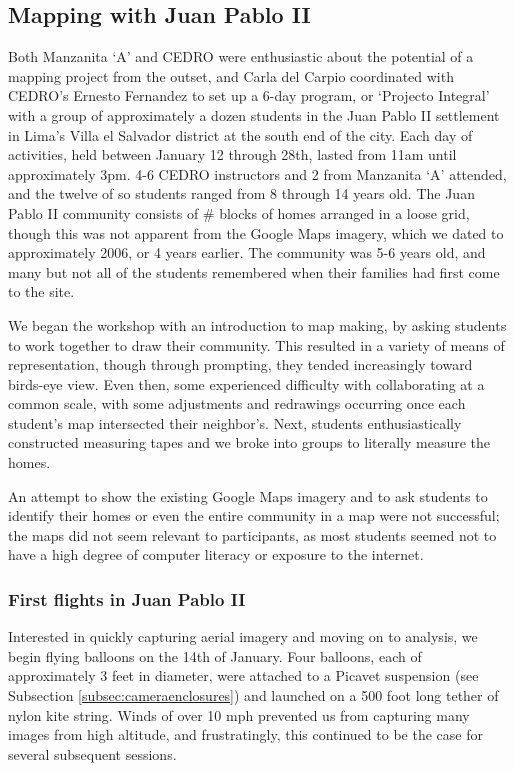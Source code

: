 \documentclass[11pt]{report}
\begin{document}
\subsection{Mapping with Juan Pablo II}

Both Manzanita `A' and CEDRO were enthusiastic about the potential of a mapping project from the outset, and Carla del Carpio coordinated with CEDRO's Ernesto Fernandez to set up a 6-day program, or `Projecto Integral' with a group of approximately a dozen students in the Juan Pablo II settlement in Lima's Villa el Salvador district at the south end of the city. Each day of activities, held between January 12 through 28th, lasted from 11am until approximately 3pm. 4-6 CEDRO instructors and 2 from Manzanita `A' attended, and the twelve of so students ranged from 8 through 14 years old. The Juan Pablo II community consists of \# blocks of homes arranged in a loose grid, though this was not apparent from the Google Maps imagery, which we dated to approximately 2006, or 4 years earlier. The community was 5-6 years old, and many but not all of the students remembered when their families had first come to the site. 

We began the workshop with an introduction to map making, by asking students to work together to draw their community. This resulted in a variety of means of representation, though through prompting, they tended increasingly toward birds-eye view. Even then, some experienced difficulty with collaborating at a common scale, with some adjustments and redrawings occurring once each student's map intersected their neighbor's. Next, students enthusiastically constructed measuring tapes and we broke into groups to literally measure the homes. 

An attempt to show the existing Google Maps imagery and to ask students to identify their homes or even the entire community in a map were not successful; the maps did not seem relevant to participants, as most students seemed not to have a high degree of computer literacy or exposure to the internet. 

\subsubsection{First flights in Juan Pablo II}

Interested in quickly capturing aerial imagery and moving on to analysis, we begin flying balloons on the 14th of January. Four balloons, each of approximately 3 feet in diameter, were attached to a Picavet suspension (see Subsection \ref{subsec:cameraenclosures}) and launched on a 500 foot long tether of nylon kite string. Winds of over 10 mph prevented us from capturing many images from high altitude, and frustratingly, this continued to be the case for several subsequent sessions. 
\end{document}
